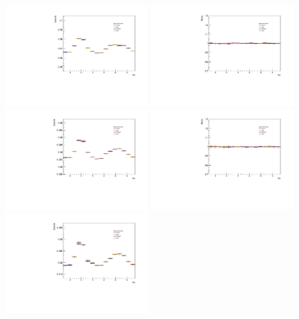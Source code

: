 \begin{figure}[ht]
    \centering
    \includegraphics[width=0.49\textwidth]{figures/analysis/signal_variations_dphi_0_20_lowpt.pdf}
    \includegraphics[width=0.49\textwidth]{figures/analysis/signal_variations_dphi_0_20_lowpt_ratio.pdf}
    \includegraphics[width=0.49\textwidth]{figures/analysis/signal_variations_dphi_20_50_lowpt.pdf}
    \includegraphics[width=0.49\textwidth]{figures/analysis/signal_variations_dphi_20_50_lowpt_ratio.pdf}
    \includegraphics[width=0.49\textwidth]{figures/analysis/signal_variations_dphi_50_80_lowpt.pdf}

\end{figure}
